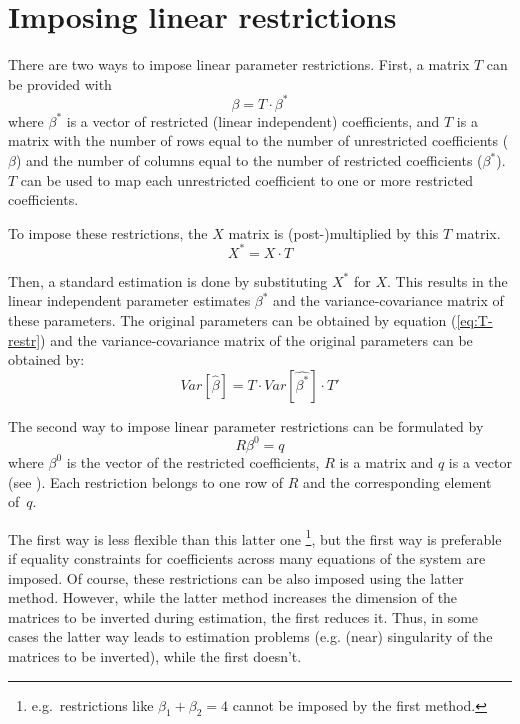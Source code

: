 \section{Imposing linear restrictions}\label{sec:Restrictions}

There are two ways to impose linear parameter restrictions.
First, a matrix $T$ can be provided with
\begin{equation}
   \beta = T \cdot \beta^* \label{eq:T-restr} 
\end{equation}
where $\beta^*$ is a vector of restricted (linear independent) coefficients,
and $T$ is a matrix with the number of rows equal to the number of
unrestricted coefficients ($\beta$) and
the number of columns equal to the number of restricted coefficients
($\beta^*$).
$T$ can be used to map each unrestricted coefficient to one or more
restricted coefficients.

To impose these restrictions, the $X$ matrix is
(post-)multiplied by this $T$ matrix.
\begin{equation}
    X^* = X \cdot T
\end{equation}

Then, a standard estimation is done by substituting $X^*$ for $X$.
This results in the linear independent parameter estimates $\beta^*$ and
the variance-covariance matrix of these parameters. 
The original parameters can be obtained by equation (\ref{eq:T-restr})
and the variance-covariance matrix of the original parameters 
can be obtained by:
\begin{equation}
   Var \left[ \widehat{\beta} \right] = T \cdot Var \left[ \widehat{\beta^*} \right] \cdot T'
\end{equation}

The second way to impose linear parameter restrictions 
can be formulated by
\begin{equation}
   R \beta^0 = q
\end{equation}
where $\beta^0$ is the vector of the restricted coefficients, 
$R$ is a matrix and $q$ is a vector (see \citealp[p. 100]{greene02}). 
Each restriction belongs to one row of $R$ and the corresponding 
element of~$q$.

The first way is less flexible than this latter one%
\footnote{e.g.\ restrictions like $\beta_1 + \beta_2 = 4$ cannot be imposed
by the first method.}, 
but the first way is preferable if equality constraints for coefficients
across many equations of the system are imposed. 
Of course, these restrictions can be also imposed using
the latter method.
However, while the latter method increases the dimension of the 
matrices to be inverted during estimation, the first reduces it. 
Thus, in some cases the latter way leads to estimation problems
(e.g. (near) singularity of the matrices to be inverted),
while the first doesn't.

